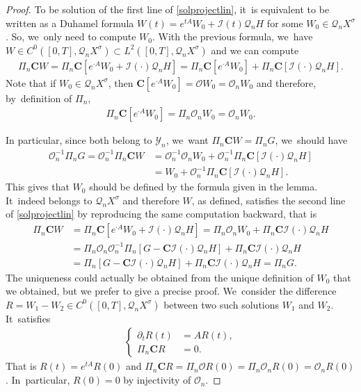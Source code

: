 \documentclass[JEP,XML,SOM,Unicode,published]{cedram}
\theoremstyle{definition}
\let\mc\mathcal
\renewcommand{\O}{\mc{O}}
\newcommand{\Q}{\mathcal{Q}}
\newcommand{\bC}{\boldsymbol{C}}
\begin{document}
\begin{proof}
To be solution of the first line of \eqref{solprojectlin}, it~is equivalent to be written as a Duhamel formula $W(t)=e^{tA}W_{0}+\mc{I}(t)\Q_nH$ for some $W_{0}\in \Q_{n}X^{\sigma}$. So, we~only need to compute $W_{0}$. With the previous formula, we~have $W\in C^{0}([0,T],\Q_{n}X^{\sigma})\subset L^{2}([0,T],\Q_{n}X^{\sigma})$ and we can compute
\begin{align*}
\Pi_n\bC W= \Pi_n\bC \left[e^{\cdot A}W_{0}+\mc{I}(\cdot)\Q_nH \right]=\Pi_n\bC \left[e^{\cdot A}W_{0} \right]+\Pi_n\bC \left[\mc{I}(\cdot)\Q_nH \right].
\end{align*}
Note that if $W_{0}\in \Q_{n}X^{\sigma}$, then $\bC\left[e^{\cdot A}W_{0}\right]=\O W_{0}=\O_{n} W_{0}$ and therefore, by~definition of $\Pi_{n}$,
\begin{align*}
\Pi_{n}\bC\left[e^{\cdot A}W_{0}\right]=\Pi_{n}\O_{n} W_{0}=\O_{n} W_{0}.
\end{align*}

In particular, since both belong to $\mathcal{Y}_n$, we~want $ \Pi_n\bC W=\Pi_{n}G$, we~should have
\begin{align*}
\O_n^{-1}\Pi_{n}G= \O_n^{-1} \Pi_n\bC W &=\O_n^{-1}\O_{n} W_{0}+\O_n^{-1}\Pi_n\bC \left[\mc{I}(\cdot)\Q_nH \right]\\ &=W_{0}+\O_n^{-1}\Pi_n\bC[\mc{I}(\cdot)\Q_nH].
\end{align*}
This gives that $W_{0}$ should be defined by the formula given in the lemma. It~indeed belongs to $\Q_{n}X^{\sigma}$ and therefore $W$, as defined, satisfies the second line of \eqref{solprojectlin} by reproducing the same computation backward, that is\vspace*{-3pt}
\begin{align*}
\Pi_n\bC W&=\Pi_n\bC\left[e^{\cdot A}W_{0}+\mc{I}(\cdot)\Q_nH\right] =\Pi_{n} \O_{n}W_{0}+\Pi_n\bC\mc{I}(\cdot)\Q_nH\\
&=\Pi_{n} \O_{n}\O_n^{-1}\Pi_n\left[G-\bC\mc{I}(\cdot)\Q_n H\right]+\Pi_n\bC\mc{I}(\cdot)\Q_nH\\
&=\Pi_n\left[G-\bC\mc{I}(\cdot)\Q_n H\right]+\Pi_n\bC\mc{I}(\cdot)\Q_nH=\Pi_{n}G.
\end{align*}
The uniqueness could actually be obtained from the unique definition of $W_{0}$ that we obtained, but we prefer to give a precise proof. We~consider the difference $R=W_{1}-W_{2}\in C^{0}([0,T],\Q_{n}X^{\sigma})$ between two such solutions $W_{1}$ and $W_{2}$. It~satisfies\vspace*{-3pt}
\begin{align*}
\left\{\begin{array}{rl}
\partial_t R(t)&=AR(t), \\[3pt]
\Pi_n\bC R &=0.
\end{array}\right.
\end{align*}
That is $R(t)=e^{tA}R(0)$ and $\Pi_n\bC R=\Pi_{n}\O R(0)=\Pi_{n}\O_{n}R(0)=\O_{n}R(0)$. In~particular, $R(0)=0$ by injectivity of $\O_{n}$.


\end{proof}
\end{document}
